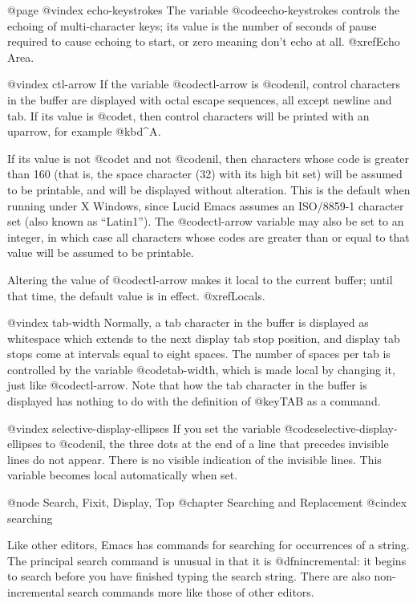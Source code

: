 {{{{@page
@vindex echo-keystrokes
  The variable @code{echo-keystrokes} controls the echoing of multi-character
keys; its value is the number of seconds of pause required to cause echoing
to start, or zero meaning don't echo at all.  @xref{Echo Area}.

@vindex ctl-arrow
  If the variable @code{ctl-arrow} is @code{nil}, control characters in the
buffer are displayed with octal escape sequences, all except newline and
tab.  If its value is @code{t}, then control characters will be printed 
with an uparrow, for example @kbd{^A}.  

If its value is not @code{t} and not @code{nil}, then characters whose
code is greater than 160 (that is, the space character (32) with its
high bit set) will be assumed to be printable, and will be displayed
without alteration.  This is the default when running under X Windows,
since Lucid Emacs assumes an ISO/8859-1 character set (also known as
``Latin1'').  The @code{ctl-arrow} variable may also be set to an
integer, in which case all characters whose codes are greater than or
equal to that value will be assumed to be printable.

Altering the value of @code{ctl-arrow} makes it local to the current
buffer; until that time, the default value is in effect.  @xref{Locals}.

@vindex tab-width
  Normally, a tab character in the buffer is displayed as whitespace which
extends to the next display tab stop position, and display tab stops come
at intervals equal to eight spaces.  The number of spaces per tab is
controlled by the variable @code{tab-width}, which is made local by
changing it, just like @code{ctl-arrow}.  Note that how the tab character
in the buffer is displayed has nothing to do with the definition of
@key{TAB} as a command.

@vindex selective-display-ellipses
  If you set the variable @code{selective-display-ellipses} to @code{nil},
the three dots at the end of a line that precedes invisible
lines do not appear.  There is no visible indication of the invisible lines.
This variable becomes local automatically when set.

@node Search, Fixit, Display, Top
@chapter Searching and Replacement
@cindex searching

  Like other editors, Emacs has commands for searching for occurrences of
a string.  The principal search command is unusual in that it is
@dfn{incremental}: it begins to search before you have finished typing the
search string.  There are also non-incremental search commands more like
those of other editors.

}}}}
